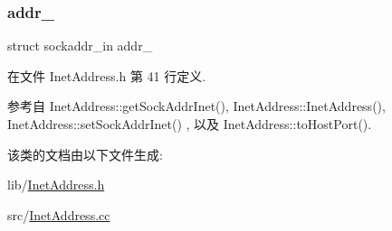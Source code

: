 \subsubsection{\texorpdfstring{addr\+\_\+}{addr\_}}
{\footnotesize\ttfamily struct sockaddr\+\_\+in addr\+\_\+\hspace{0.3cm}{\ttfamily [private]}}



在文件 Inet\+Address.\+h 第 41 行定义.



参考自 Inet\+Address\+::get\+Sock\+Addr\+Inet(), Inet\+Address\+::\+Inet\+Address(), Inet\+Address\+::set\+Sock\+Addr\+Inet() , 以及 Inet\+Address\+::to\+Host\+Port().



该类的文档由以下文件生成\+:\begin{DoxyCompactItemize}
\item 
lib/\hyperlink{InetAddress_8h}{Inet\+Address.\+h}\item 
src/\hyperlink{InetAddress_8cc}{Inet\+Address.\+cc}\end{DoxyCompactItemize}
